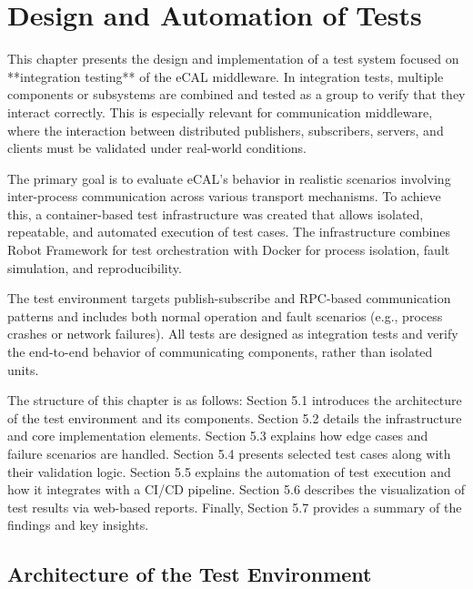 \clearpage
\section{Design and Automation of Tests}

This chapter presents the design and implementation of a test system focused on **integration testing** of the eCAL middleware. In integration tests, multiple components or subsystems are combined and tested as a group to verify that they interact correctly. This is especially relevant for communication middleware, where the interaction between distributed publishers, subscribers, servers, and clients must be validated under real-world conditions.

\vspace{0.9em}
The primary goal is to evaluate eCAL’s behavior in realistic scenarios involving inter-process communication across various transport mechanisms. To achieve this, a container-based test infrastructure was created that allows isolated, repeatable, and automated execution of test cases. The infrastructure combines Robot Framework for test orchestration with Docker for process isolation, fault simulation, and reproducibility.

\vspace{0.9em}
The test environment targets publish-subscribe and RPC-based communication patterns and includes both normal operation and fault scenarios (e.g., process crashes or network failures). All tests are designed as integration tests and verify the end-to-end behavior of communicating components, rather than isolated units.

\vspace{0.9em}
The structure of this chapter is as follows: Section 5.1 introduces the architecture of the test environment and its components. Section 5.2 details the infrastructure and core implementation elements. Section 5.3 explains how edge cases and failure scenarios are handled. Section 5.4 presents selected test cases along with their validation logic. Section 5.5 explains the automation of test execution and how it integrates with a CI/CD pipeline. Section 5.6 describes the visualization of test results via web-based reports. Finally, Section 5.7 provides a summary of the findings and key insights.

\subsection{Architecture of the Test Environment}

